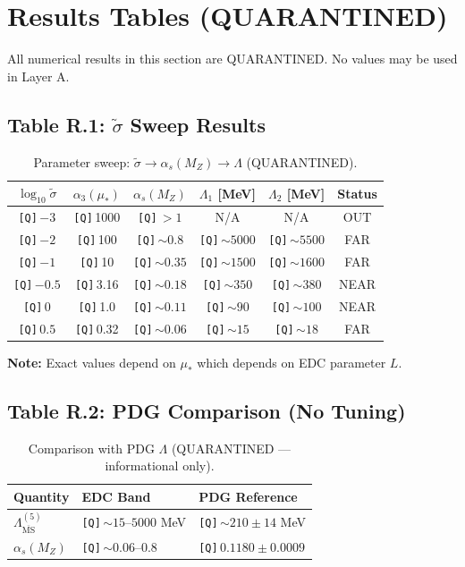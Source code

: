 \documentclass[11pt,a4paper]{article}
\newcommand{\Qnum}[1]{\textcolor{red!70!black}{\texttt{[Q]}}\,#1}
\theoremstyle{definition}
\begin{document}
\section{Results Tables (QUARANTINED)}
\label{sec:results}

\begin{quarantinebox}
All numerical results in this section are QUARANTINED.
No values may be used in Layer A.
\end{quarantinebox}

\subsection{Table R.1: $\tilde{\sigma}$ Sweep Results}
\label{subsec:table-r1}

\begin{table}[ht]
\centering
\caption{Parameter sweep: $\tilde{\sigma} \to \alpha_s(M_Z) \to \Lambda$ (QUARANTINED).}
\label{tab:sweep-results}
\begin{tabular}{cccccc}
\toprule
$\log_{10}\tilde{\sigma}$ & $\alpha_3(\mu_*)$ & $\alpha_s(M_Z)$ & $\Lambda_1$ [MeV] & $\Lambda_2$ [MeV] & Status \\
\midrule
\Qnum{$-3$} & \Qnum{1000} & \Qnum{$>1$} & N/A & N/A & OUT \\
\Qnum{$-2$} & \Qnum{100} & \Qnum{$\sim 0.8$} & \Qnum{$\sim 5000$} & \Qnum{$\sim 5500$} & FAR \\
\Qnum{$-1$} & \Qnum{10} & \Qnum{$\sim 0.35$} & \Qnum{$\sim 1500$} & \Qnum{$\sim 1600$} & FAR \\
\Qnum{$-0.5$} & \Qnum{3.16} & \Qnum{$\sim 0.18$} & \Qnum{$\sim 350$} & \Qnum{$\sim 380$} & NEAR \\
\Qnum{$0$} & \Qnum{1.0} & \Qnum{$\sim 0.11$} & \Qnum{$\sim 90$} & \Qnum{$\sim 100$} & NEAR \\
\Qnum{$0.5$} & \Qnum{0.32} & \Qnum{$\sim 0.06$} & \Qnum{$\sim 15$} & \Qnum{$\sim 18$} & FAR \\
\bottomrule
\end{tabular}
\end{table}

\textbf{Note:} Exact values depend on $\mu_*$ which depends on EDC parameter $L$.

\subsection{Table R.2: PDG Comparison (No Tuning)}
\label{subsec:table-r2}

\begin{table}[ht]
\centering
\caption{Comparison with PDG $\Lambda$ (QUARANTINED --- informational only).}
\label{tab:pdg-comparison}
\begin{tabular}{lll}
\toprule
Quantity & EDC Band & PDG Reference \\
\midrule
$\Lambda_{\overline{\text{MS}}}^{(5)}$ & \Qnum{$\sim 15$--$5000$} MeV & \Qnum{$\sim 210 \pm 14$} MeV \\
$\alpha_s(M_Z)$ & \Qnum{$\sim 0.06$--$0.8$} & \Qnum{$0.1180 \pm 0.0009$} \\
\bottomrule
\end{tabular}
\end{table}
\end{document}
